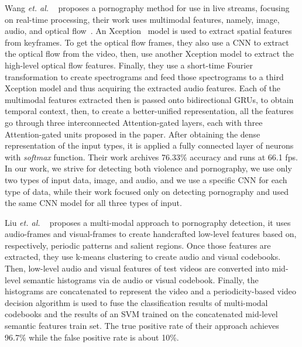 Wang \textit{et. al.} ~\cite{wang2019porn} proposes a pornography method for use in live streams, focusing on real-time processing, their work uses multimodal features, namely, image, audio, and optical flow~\cite{horn1981opticalflow}. 
An Xception~\cite{chollet2017xception} model is used to extract spatial features from keyframes. 
To get the optical flow frames, they also use a CNN to extract the optical flow from the video, then, use another Xception model to extract the high-level optical flow features. 
Finally, they use a short-time Fourier transformation to create spectrograms and feed those spectrograms to a third Xception model and thus acquiring the extracted audio features.  
Each of the multimodal features extracted then is passed onto bidirectional GRUs\cite{dey2017GRU}, to obtain temporal context, then, to create a better-unified representation, all the features go through three interconnected Attention-gated layers, each with three Attention-gated units proposed in the paper. After obtaining the dense representation of the input types, it is applied a fully connected layer of neurons with \textit{softmax} function. Their work archives 76.33\% accuracy and runs at 66.1 fps.
In our work, we strive for detecting both violence and pornography, we use only two types of input data, image, and audio, and we use a specific CNN for each type of data, while their work focused only on detecting pornography and used the same CNN model for all three types of input. 

Liu \textit{et. al.} ~\cite{liu2020analyzing} proposes a multi-modal approach to pornography detection, it uses audio-frames and visual-frames to create handcrafted low-level features based on, respectively, periodic patterns and salient regions. Once those features are extracted, they use k-means clustering to create audio and visual codebooks. 
Then, low-level audio and visual features of test videos are converted into mid-level semantic histograms via de audio or visual codebook. 
Finally, the histograms are concatenated to represent the video and a periodicity-based video decision algorithm is used to fuse the classification results of multi-modal codebooks and the results of an SVM trained on the concatenated mid-level semantic features train set.
The true positive rate of their approach achieves 96.7\% while the false positive rate is about 10\%.

